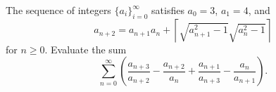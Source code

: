 The sequence of integers $\{a_i\}_{i = 0}^{\infty}$ satisfies $a_0 = 3$, $a_1 = 4$, and
\[a_{n+2} = a_{n+1} a_n + \left\lceil \sqrt{a_{n+1}^2 - 1} \sqrt{a_n^2 - 1}\right\rceil\]for $n \ge 0$. Evaluate the sum
\[\sum_{n = 0}^{\infty} \left(\frac{a_{n+3}}{a_{n+2}} - \frac{a_{n+2}}{a_n} + \frac{a_{n+1}}{a_{n+3}} - \frac{a_n}{a_{n+1}}\right).\]